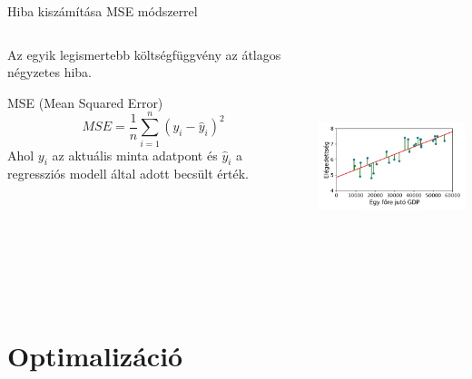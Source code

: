 \documentclass[english, aspectratio=169]{beamer}
\makeatletter
\let\origtableofcontents=\tableofcontents
\def\tableofcontents{\@ifnextchar[{\origtableofcontents}{\gobbletableofcontents}}
\def\gobbletableofcontents#1{\origtableofcontents}
\makeatother
\begin{document}
\begin{frame}{Hiba kiszámítása MSE módszerrel}
\begin{columns}
\begin{column}{.5\textwidth}
Az egyik legismertebb költségfüggvény az átlagos négyzetes hiba.
\begin{block}{MSE (Mean Squared Error)}
\[
MSE = \frac{1}{n} \sum_{i=1}^n \left( y_i - \hat{y}_i \right)^2
\]
Ahol $y_i$ az aktuális minta adatpont és $\hat{y}_i$ a regressziós modell által adott becsült érték. 
\end{block}
\end{column}
\begin{column}{.5\textwidth}
\begin{center}
\includegraphics[width=7cm, height=7cm, keepaspectratio]{images/regresszio_10.png}
\end{center}
\end{column}
\end{columns}
\end{frame}

\section{Optimalizáció}

\begin{frame}
\tableofcontents[currentsection]
\end{frame}
\end{document}
